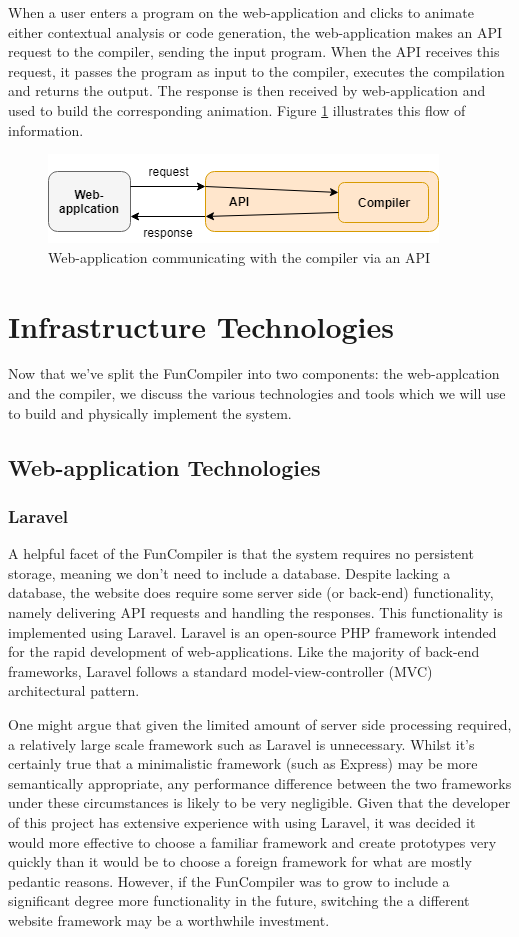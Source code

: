 \documentclass{l4proj}
\begin{document}
When a user enters a program on the web-application and clicks to animate either contextual analysis or code generation, the web-application makes an API request to the compiler, sending the input program.  When the API receives this request, it passes the program as input to the compiler, executes the compilation and returns the output. The response is then received by web-application and used to build the corresponding animation. Figure \ref{fig:funinfra0} illustrates this flow of information.

 \begin{figure}[h]
\centering
\includegraphics[scale=0.7]{images/funinfra0.png}
\caption{Web-application communicating with the compiler via an API}
\label{fig:funinfra0}	
\end{figure}
\section{Infrastructure Technologies}
Now that we've split the FunCompiler into two components: the web-applcation and the compiler, we discuss the various technologies and tools which we will use to build and physically implement the system.
\subsection{Web-application Technologies}
\subsubsection{Laravel}
A helpful facet of the FunCompiler is that the system requires no persistent storage, meaning we don't need to include a database. Despite lacking a database, the website does require some server side (or back-end) functionality, namely delivering API requests and handling the responses. This functionality is implemented using Laravel. Laravel is an open-source PHP framework intended for the rapid development of web-applications. Like the majority of back-end frameworks, Laravel follows a standard model-view-controller (MVC) architectural pattern. 

One might argue that given the limited amount of server side processing required, a relatively large scale framework such as Laravel is unnecessary. Whilst it's certainly true that a minimalistic framework (such as Express) may be more semantically appropriate, any performance difference between the two frameworks under these circumstances is likely to be very negligible. Given that the developer of this project has extensive experience with using Laravel, it was decided it would more effective to choose a familiar framework and create prototypes very quickly than it would be to choose a foreign framework for what are mostly pedantic reasons. However, if the FunCompiler was to grow to include a significant degree more functionality in the future, switching the a different website framework may be a worthwhile investment.    
\end{document}
